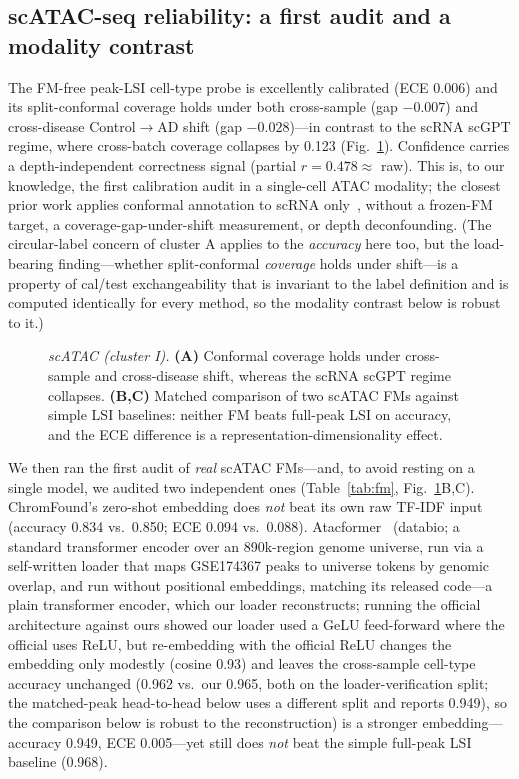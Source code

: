 \documentclass[11pt]{article}
\begin{document}
\subsection{scATAC-seq reliability: a first audit and a modality contrast}
The FM-free peak-LSI cell-type probe is excellently calibrated (ECE 0.006) and its split-conformal coverage holds under both cross-sample (gap $-0.007$) and cross-disease Control$\to$AD shift (gap $-0.028$)---in contrast to the scRNA scGPT regime, where cross-batch coverage collapses by 0.123 (Fig.~\ref{fig:scatac}). Confidence carries a depth-independent correctness signal (partial $r=0.478\approx$ raw). This is, to our knowledge, the first calibration audit in a single-cell ATAC modality; the closest prior work applies conformal annotation to scRNA only~\cite{lopezdecastro2025}, without a frozen-FM target, a coverage-gap-under-shift measurement, or depth deconfounding. (The circular-label concern of cluster A applies to the \emph{accuracy} here too, but the load-bearing finding---whether split-conformal \emph{coverage} holds under shift---is a property of cal/test exchangeability that is invariant to the label definition and is computed identically for every method, so the modality contrast below is robust to it.)

\begin{figure}[htb]\centering
\caption{\emph{scATAC (cluster I).} \textbf{(A)} Conformal coverage holds under cross-sample and cross-disease shift, whereas the scRNA scGPT regime collapses. \textbf{(B,C)} Matched comparison of two scATAC FMs against simple LSI baselines: neither FM beats full-peak LSI on accuracy, and the ECE difference is a representation-dimensionality effect.}\label{fig:scatac}\end{figure}

We then ran the first audit of \emph{real} scATAC FMs---and, to avoid resting on a single model, we audited two independent ones (Table~\ref{tab:fm}, Fig.~\ref{fig:scatac}B,C). ChromFound's zero-shot embedding does \emph{not} beat its own raw TF-IDF input (accuracy 0.834 vs.\ 0.850; ECE 0.094 vs.\ 0.088). Atacformer~\cite{atacformer2024} (databio; a standard transformer encoder over an 890k-region genome universe, run via a self-written loader that maps GSE174367 peaks to universe tokens by genomic overlap, and run without positional embeddings, matching its released code---a plain transformer encoder, which our loader reconstructs; running the official architecture against ours showed our loader used a GeLU feed-forward where the official uses ReLU, but re-embedding with the official ReLU changes the embedding only modestly (cosine 0.93) and leaves the cross-sample cell-type accuracy unchanged (0.962 vs.\ our 0.965, both on the loader-verification split; the matched-peak head-to-head below uses a different split and reports 0.949), so the comparison below is robust to the reconstruction) is a stronger embedding---accuracy 0.949, ECE 0.005---yet still does \emph{not} beat the simple full-peak LSI baseline (0.968).
\end{document}
